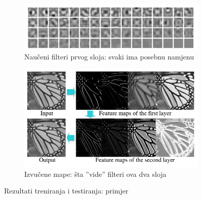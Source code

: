 \documentclass[12pt]{report}
\numberwithin{equation}{section}
\begin{document}
\begin{figure}[h]
\begin{subfigure}{1\textwidth}
  \centering
  \includegraphics[width=1\linewidth]{SLIKE/figure5}
  \caption{Naučeni filteri prvog sloja: svaki ima posebnu namjenu}
  \label{fig:trening_sfig1}
\end{subfigure}
\begin{subfigure}{0.95\textwidth}
  \centering
  \includegraphics[width=1\linewidth]{SLIKE/figure6}
  \caption{Izvučene mape: šta ''vide'' filteri ova dva sloja}
  \label{fig:trening_sfig2}
\end{subfigure}
\caption{Rezultati treniranja i testiranja: primjer}
\label{fig:trening}
\end{figure}
 
 
%



\end{document}
